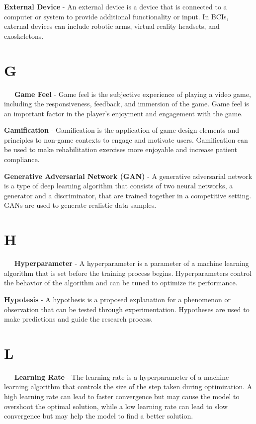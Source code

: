 \textbf{External Device} - An external device is a device that is connected to a computer or system to provide additional functionality or input. In BCIs, external devices can include robotic arms, virtual reality headsets, and exoskeletons.

\section*{G}

\-\ \-\ \-\ \textbf{Game Feel} - Game feel is the subjective experience of playing a video game, including the responsiveness, feedback, and immersion of the game. Game feel is an important factor in the player's enjoyment and engagement with the game.

\textbf{Gamification} - Gamification is the application of game design elements and principles to non-game contexts to engage and motivate users. Gamification can be used to make rehabilitation exercises more enjoyable and increase patient compliance.

\textbf{Generative Adversarial Network (GAN)} - A generative adversarial network is a type of deep learning algorithm that consists of two neural networks, a generator and a discriminator, that are trained together in a competitive setting. GANs are used to generate realistic data samples.

\section*{H}

\-\ \-\ \-\ \textbf{Hyperparameter} - A hyperparameter is a parameter of a machine learning algorithm that is set before the training process begins. Hyperparameters control the behavior of the algorithm and can be tuned to optimize its performance.

\textbf{Hypotesis} - A hypothesis is a proposed explanation for a phenomenon or observation that can be tested through experimentation. Hypotheses are used to make predictions and guide the research process.

\section*{L}

\-\ \-\ \-\ \textbf{Learning Rate} - The learning rate is a hyperparameter of a machine learning algorithm that controls the size of the step taken during optimization. A high learning rate can lead to faster convergence but may cause the model to overshoot the optimal solution, while a low learning rate can lead to slow convergence but may help the model to find a better solution.

